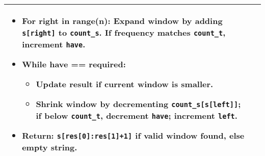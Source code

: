 \begin{summary}
\begin{center}
\begin{tabular}{ll}
{\begin{itemize}
                    \item \textbf{For right in range(n):} Expand window by adding \texttt{s[right]} to \texttt{count\_s}. If frequency matches \texttt{count\_t}, increment \texttt{have}.
                    
                    \item \textbf{While have == required:}
                    \begin{itemize}
                        \item Update result if current window is smaller.
                        \item Shrink window by decrementing \texttt{count\_s[s[left]]}; if below \texttt{count\_t}, decrement \texttt{have}; increment \texttt{left}.
                    \end{itemize}
                    
                    \item \textbf{Return:} \texttt{s[res[0]:res[1]+1]} if valid window found, else empty string.
                \end{itemize}                
            } \\
            \bottomrule
        \end{tabular}
    \end{center}
\end{summary}